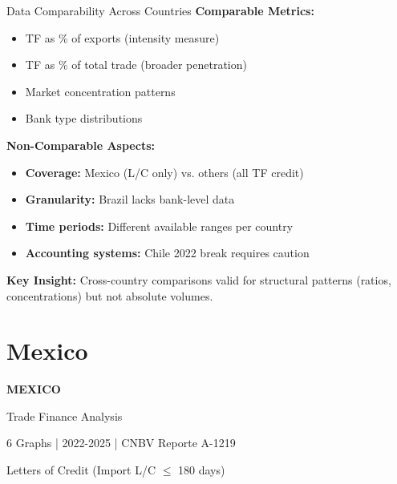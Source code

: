 \documentclass[aspectratio=169,11pt]{beamer}
\begin{document}
\begin{frame}{Data Comparability Across Countries}
\textbf{Comparable Metrics:}
\begin{itemize}
    \item TF as \% of exports (intensity measure)
    \item TF as \% of total trade (broader penetration)
    \item Market concentration patterns
    \item Bank type distributions
\end{itemize}

\vspace{0.3cm}
\textbf{Non-Comparable Aspects:}
\begin{itemize}
    \item \textbf{Coverage:} Mexico (L/C only) vs. others (all TF credit)
    \item \textbf{Granularity:} Brazil lacks bank-level data
    \item \textbf{Time periods:} Different available ranges per country
    \item \textbf{Accounting systems:} Chile 2022 break requires caution
\end{itemize}

\vspace{0.3cm}
\textbf{Key Insight:} Cross-country comparisons valid for structural patterns (ratios, concentrations) but not absolute volumes.
\end{frame}


\section{Mexico}

\begin{frame}
\begin{center}
\vspace{2cm}
{\Huge \textbf{MEXICO}}

\vspace{0.5cm}
{\Large Trade Finance Analysis}

\vspace{1cm}
\large
6 Graphs | 2022-2025 | CNBV Reporte A-1219

\vspace{0.3cm}
\normalsize
Letters of Credit (Import L/C $\leq$ 180 days)
\end{center}
\end{frame}
\end{document}

